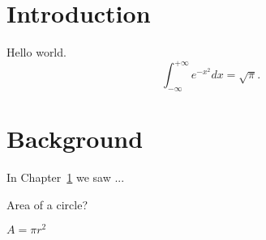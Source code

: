 \documentclass{camel}
\begin{document}
\chapter{Introduction}\label{ch:intro} 
Hello world. 
\begin{equation}\label{eq:gauss}
\int_{-\infty}^{+\infty} e^{-x^2}dx = \sqrt{\pi}.
\end{equation}
\chapter{Background}
In Chapter~\ref{ch:intro} we saw ... 
\begin{exercise}
\begin{questions}
\question Area of a circle? 
\begin{answer}
$A = \pi r^2$
\end{answer}
\end{questions}
\end{exercise}
\end{document}
